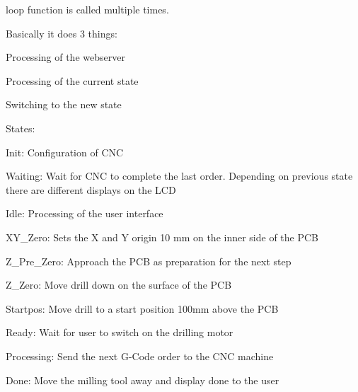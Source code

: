 loop function is called multiple times. 

Basically it does 3 things\-:
\begin{DoxyEnumerate}
\item Processing of the webserver
\item Processing of the current state
\item Switching to the new state 
\end{DoxyEnumerate}States\-:
\begin{DoxyItemize}
\item Init\-: Configuration of C\-N\-C\par

\item Waiting\-: Wait for C\-N\-C to complete the last order. Depending on previous state there are different displays on the L\-C\-D\par

\item Idle\-: Processing of the user interface\par

\item X\-Y\-\_\-\-Zero\-: Sets the X and Y origin 10 mm on the inner side of the P\-C\-B\par

\item Z\-\_\-\-Pre\-\_\-\-Zero\-: Approach the P\-C\-B as preparation for the next step\par

\item Z\-\_\-\-Zero\-: Move drill down on the surface of the P\-C\-B\par

\item Startpos\-: Move drill to a start position 100mm above the P\-C\-B\par

\item Ready\-: Wait for user to switch on the drilling motor\par

\item Processing\-: Send the next G-\/\-Code order to the C\-N\-C machine\par

\item Done\-: Move the milling tool away and display done to the user\par
 
\end{DoxyItemize}

